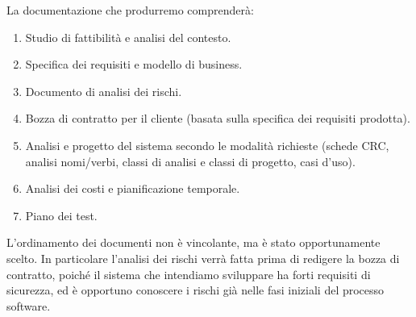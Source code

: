 \documentclass[]{softeng}
\begin{document}
La documentazione che produrremo comprender\`a:
\begin{enumerate}
	\item Studio di fattibilit\`a e analisi del contesto.
	\item Specifica dei requisiti e modello di business.
	\item Documento di analisi dei rischi.
	\item Bozza di contratto per il cliente (basata sulla specifica dei requisiti prodotta).
	\item Analisi e progetto del sistema secondo le modalit\`a richieste (schede CRC, analisi nomi/verbi, classi di analisi e classi di progetto, casi d'uso).
	\item Analisi dei costi e pianificazione temporale.
	\item Piano dei test.
\end{enumerate}
L'ordinamento dei documenti non \`e vincolante, ma \`e stato opportunamente scelto.
In particolare l'analisi dei rischi verr\`a fatta prima di redigere la bozza di contratto, poich\'e il sistema che intendiamo sviluppare ha forti requisiti di sicurezza, ed \`e opportuno conoscere i rischi gi\`a nelle fasi iniziali del processo software.

\renewcommand{\refname}{Riferimenti}
\printbibliography
\end{document}
